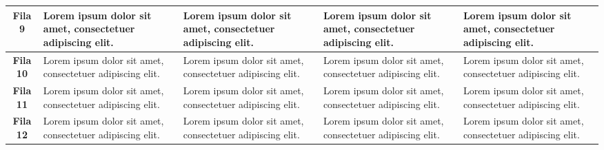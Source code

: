 \begin{longtable}{p{2cm}|p{3cm}|p{3cm}|p{3cm}|p{3cm}|}
    \multicolumn{1}{|c|}{\textbf{Fila 9}} & Lorem ipsum dolor sit amet, consectetuer adipiscing elit. & Lorem ipsum dolor sit amet, consectetuer adipiscing elit. & Lorem ipsum dolor sit amet, consectetuer adipiscing elit. & Lorem ipsum dolor sit amet, consectetuer adipiscing elit. \\ \hline    
    \multicolumn{1}{|c|}{\textbf{Fila 10}} & Lorem ipsum dolor sit amet, consectetuer adipiscing elit. & Lorem ipsum dolor sit amet, consectetuer adipiscing elit. & Lorem ipsum dolor sit amet, consectetuer adipiscing elit. & Lorem ipsum dolor sit amet, consectetuer adipiscing elit. \\ \hline    
    \multicolumn{1}{|c|}{\textbf{Fila 11}} & Lorem ipsum dolor sit amet, consectetuer adipiscing elit. & Lorem ipsum dolor sit amet, consectetuer adipiscing elit. & Lorem ipsum dolor sit amet, consectetuer adipiscing elit. & Lorem ipsum dolor sit amet, consectetuer adipiscing elit. \\ \hline    
    \multicolumn{1}{|c|}{\textbf{Fila 12}} & Lorem ipsum dolor sit amet, consectetuer adipiscing elit. & Lorem ipsum dolor sit amet, consectetuer adipiscing elit. & Lorem ipsum dolor sit amet, consectetuer adipiscing elit. & Lorem ipsum dolor sit amet, consectetuer adipiscing elit. \\ \hline    
\end{longtable}
    